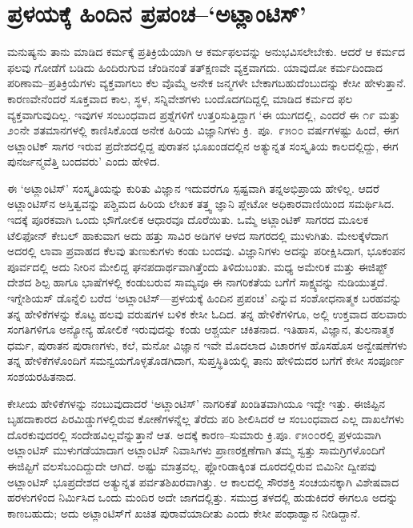 \section*{ಪ್ರಳಯಕ್ಕೆ ಹಿಂದಿನ ಪ್ರಪಂಚ–‘ಅಟ್ಲಾಂಟಿಸ್​'}


ಮನುಷ್ಯನು ತಾನು ಮಾಡಿದ ಕರ್ಮಕ್ಕೆ ಪ್ರತಿಕ್ರಿಯೆಯಾಗಿ ಆ ಕರ್ಮಫಲವನ್ನು ಅನುಭವಿಸಲೇಬೇಕು. ಆದರೆ ಆ ಕರ್ಮದ ಫಲವು ಗೋಡೆಗೆ ಬಡಿದು ಹಿಂದಿರುಗುವ ಚೆಂಡಿನಂತೆ ತತ್​ಕ್ಷಣವೇ ವ್ಯಕ್ತವಾಗದು. ಯಾವುದೋ ಕರ್ಮದಿಂದಾದ ಪರಿಣಾಮ–ಪ್ರತಿಕ್ರಿಯೆಗಳು ವ್ಯಕ್ತವಾಗಲು ಕೆಲ ವೊಮ್ಮೆ ಅನೇಕ ಜನ್ಮಗಳೇ ಬೇಕಾಗಬಹುದೆಂಬುದನ್ನು ಕೇಸೀ ಹೇಳುತ್ತಾನೆ. ಕಾರಣವೇನೆಂದರೆ ಸೂಕ್ತವಾದ ಕಾಲ, ಸ್ಥಳ, ಸನ್ನಿವೇಶಗಳು ಬಂದೊದಗದಿದ್ದಲ್ಲಿ ಮಾಡಿದ ಕರ್ಮದ ಫಲ ವ್ಯಕ್ತವಾಗುವುದಿಲ್ಲ. ಇವುಗಳ ಸಂಬಂಧವಾದ ಪ್ರಶ್ನೆಗಳಿಗೆ ಉತ್ತರಿಸುತ್ತಿದ್ದಾಗ ‘ಈ ಯುಗದಲ್ಲಿ, ಎಂದರೆ ಈ ೧೯ ಮತ್ತು ೨೦ನೇ ಶತಮಾನಗಳಲ್ಲಿ ಕಾಣಿಸಿಕೊಂಡ ಅನೇಕ ಹಿರಿಯ ವಿಜ್ಞಾನಿಗಳು ಕ್ರಿ.\ ಪೂ.\ ೯೫೦೦ ವರ್ಷಗಳಷ್ಟು ಹಿಂದೆ, ಈಗ ಅಟ್ಲಾಂಟಿಕ್ ಸಾಗರ ಇರುವ ಪ್ರದೇಶದಲ್ಲಿದ್ದ ಪುರಾತನ ಭೂಖಂಡದಲ್ಲಿನ ಅತ್ಯುನ್ನತ ಸಂಸ್ಕೃತಿಯ ಕಾಲದಲ್ಲಿದ್ದು, ಈಗ ಪುನರ್ಜನ್ಮವೆತ್ತಿ ಬಂದವರು’ ಎಂದು ಹೇಳಿದ.

ಈ ‘ಅಟ್ಲಾಂಟಿಸ್​’ ಸಂಸ್ಕೃತಿಯನ್ನು ಕುರಿತು ವಿಜ್ಞಾನ ಇದುವರೆಗೂ ಸ್ಪಷ್ಟವಾಗಿ ತನ್ನ\break ಅಭಿಪ್ರಾಯ ಹೇಳಿಲ್ಲ. ಆದರೆ ಅಟ್ಲಾಂಟಿಸ್​ನ ಅಸ್ತಿತ್ವವನ್ನು ಪಶ್ಚಿಮದ ಹಿರಿಯ ಲೇಖಕ ತತ್ತ್ವ ಜ್ಞಾನಿ ಪ್ಲೇಟೋ ಅಧಿಕಾರವಾಣಿಯಿಂದ ಸಮರ್ಥಿಸಿದ. ಇದಕ್ಕೆ ಪೂರಕವಾಗಿ ಒಂದು ಭೌಗೋಲಿಕ ಆಧಾರವೂ ದೊರೆಯಿತು. ಒಮ್ಮೆ ಅಟ್ಲಾಂಟಿಕ್ ಸಾಗರದ ಮೂಲಕ ಟೆಲಿಫೋನ್ ಕೇಬಲ್ ಹಾಕುವಾಗ ಅದು ಹತ್ತು ಸಾವಿರ ಅಡಿಗಳ ಆಳದ ಸಾಗರದಲ್ಲಿ ಮುಳುಗಿತು. ಮೇಲಕ್ಕೆಳೆದಾಗ ಅದರಲ್ಲಿ ಲಾವಾ ಪ್ರವಾಹದ ಕೆಲವು ತುಣುಕುಗಳು ಕಂಡು ಬಂದವು. ವಿಜ್ಞಾನಿಗಳು ಅದನ್ನು ಪರೀಕ್ಷಿಸಿದಾಗ, ಭೂಕಂಪನ ಪೂರ್ವದಲ್ಲಿ ಅದು ನೀರಿನ ಮೇಲಿದ್ದ ಘನಪದಾರ್ಥವಾಗಿತ್ತೆಂದು ತಿಳಿದುಬಂತು. ಮಧ್ಯ ಅಮೇರಿಕ ಮತ್ತು ಈಜಿಪ್ಟ್ ದೇಶದ ಶಿಲ್ಪ ಹಾಗೂ ಭಾಷೆಗಳಲ್ಲಿ ಕಂಡುಬರುವ ಸಾಮ್ಯವೂ ಈ ನಾಗರಿಕತೆಯ ಬಗೆಗೆ ಸಾಕ್ಷ್ಯವನ್ನು ನುಡಿಯುತ್ತದೆ. ಇಗ್ನೇಶಿಯಸ್ ಡೊನ್ನೆಲಿ ಬರೆದ ‘ಅಟ್ಲಾಂಟಿಸ್​—ಪ್ರಳಯಕ್ಕೆ ಹಿಂದಿನ ಪ್ರಪಂಚ’ ಎನ್ನುವ ಸಂಶೋಧನಾತ್ಮಕ ಬರಹವನ್ನು ತನ್ನ ಹೇಳಿಕೆಗಳನ್ನು ಕೊಟ್ಟ ಹಲವು ವರುಷಗಳ ಬಳಿಕ ಕೇಸೀ ಓದಿದ. ತನ್ನ ಹೇಳಿಕೆಗಳಿಗೂ, ಅಲ್ಲಿ ಉಕ್ತವಾದ ಹಲವಾರು ಸಂಗತಿಗಳಿಗೂ ಅನ್ಯೋನ್ಯ ಹೋಲಿಕೆ ಇರುವುದನ್ನು ಕಂಡು ಆಶ್ಚರ್ಯ ಚಕಿತನಾದ. ಇತಿಹಾಸ, ವಿಜ್ಞಾನ, ತುಲನಾತ್ಮಕ ಧರ್ಮ, ಪುರಾತನ ಪುರಾಣಗಳು, ಕಲೆ, ಮನೋ ವಿಜ್ಞಾನ ಇವೇ ಮೊದಲಾದ ವಿಚಾರಗಳ ಹೊಸಹೊಸ ಅನ್ವೇಷಣೆಗಳು ತನ್ನ ಹೇಳಿಕೆಗಳೊಂದಿಗೆ ಸಮನ್ವಯಗೊಳ್ಳತೊಡಗಿದಾಗ, ಸುಪ್ತಸ್ಥಿತಿಯಲ್ಲಿ ತಾನು ಹೇಳಿದುದರ ಬಗೆಗೆ ಕೇಸೀ ಸಂಪೂರ್ಣ ಸಂಶಯರಹಿತನಾದ.

ಕೇಸೀಯ ಹೇಳಿಕೆಗಳನ್ನು ನಂಬುವುದಾದರೆ ‘ಅಟ್ಲಾಂಟಿಸ್​’ ನಾಗರಿಕತೆ ಖಂಡಿತವಾಗಿಯೂ ಇದ್ದೇ ಇತ್ತು. ಈಜಿಪ್ಟಿನ ಬೃಹದಾಕಾರದ ಪಿರಮಿಡ್ಡುಗಳಲ್ಲಿರುವ ಕೋಣೆಗಳನ್ನೆಲ್ಲ ತೆರೆದು ಪರಿ ಶೀಲಿಸಿದರೆ ಆ ಸಂಬಂಧವಾದ ಎಲ್ಲ ದಾಖಲೆಗಳು ದೊರಕುವುದರಲ್ಲಿ ಸಂದೇಹವಿಲ್ಲವೆನ್ನುತ್ತಾನೆ ಆತ. ಅದಕ್ಕೆ ಕಾರಣ–ಸುಮಾರು ಕ್ರಿ.ಪೂ. ೯೫೦೦ರಲ್ಲಿ ಪ್ರಳಯವಾಗಿ ಅಟ್ಲಾಂಟಿಸ್ ಮುಳುಗಡೆಯಾದಾಗ ಅಟ್ಲಾಂಟಿಸ್ ನಿವಾಸಿಗಳು ಪ್ರಾಣರಕ್ಷಣೆಗಾಗಿ ತಮ್ಮ ಸ್ವತ್ತು ಸಾಮಗ್ರಿ\-ಗಳೊಂ\-ದಿಗೆ ಈಜಿಪ್ಟಿಗೆ ವಲಸೆಬಂದಿದ್ದುದೇ ಆಗಿದೆ. ಅಷ್ಟು ಮಾತ್ರವಲ್ಲ. ಫ್ಲೋರಿಡಾಕ್ಕಿಂತ ದೂರದಲ್ಲಿರುವ ಬಿಮಿನೀ ದ್ವೀಪವು ಅಟ್ಲಾಂಟಿಸ್ ಭೂಪ್ರದೇಶದ ಅತ್ಯುನ್ನತ ಪರ್ವತಶಿಖರವಾಗಿತ್ತು. ಆ ಕಾಲದಲ್ಲಿ ಸೌರಶಕ್ತಿ ಸಂಚಯನಕ್ಕಾಗಿ ವಿಶೇಷವಾದ ಹರಳುಗಳಿಂದ ನಿರ್ಮಿಸಿದ ಒಂದು ಮಂದಿರ ಅದೇ ಜಾಗದಲ್ಲಿತ್ತು. ಸಮುದ್ರ ತಳದಲ್ಲಿ ಹುಡುಕಿದರೆ ಈಗಲೂ ಅದನ್ನು ಕಾಣಬಹುದು; ಅದು ಅಟ್ಲಾಂಟಿಸ್​ಗೆ ಖಚಿತ ಪುರಾವೆಯಾದೀತು ಎಂದು ಕೇಸೀ ಪಂಥಾಹ್ವಾನ ನೀಡಿದ್ದಾನೆ.


